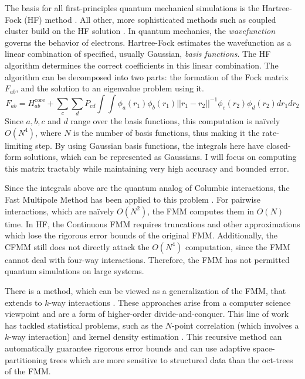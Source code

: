 \documentclass[twoside,leqno, 12pt]{article}
\begin{document}
The basis for all first-principles quantum mechanical simulations is the Hartree-Fock (HF) method \cite{RevModPhys.23.69}.  All other, more sophisticated methods such as coupled cluster build on the HF solution \cite{cc}.  In quantum mechanics, the \emph{wavefunction} governs the behavior of electrons.  Hartree-Fock estimates the wavefunction as a linear combination of specified, usually Gaussian, \emph{basis functions}.  The HF algorithm determines the correct coefficients in this linear combination.  The algorithm can be decomposed into two parts: the formation of the Fock matrix $F_{a b}$, and the solution to an eigenvalue problem using it.  
\begin{displaymath}
F_{a b} = H^{\textrm{core}}_{a b} + \sum_c \sum_d P_{c d} \int \int \phi_a(r_1) \phi_b(r_1) ||r_1 - r_2||^{-1} \phi_c(r_2) \phi_d(r_2) dr_1 dr_2
\end{displaymath}
Since $a, b, c$ and $d$ range over the basis functions, this computation is na\"{i}vely $O(N^4)$, where $N$ is the number of basis functions, thus making it the rate-limiting step.  By using Gaussian basis functions, the integrals here have closed-form solutions, which can be represented as Gaussians.  I will focus on computing this matrix tractably while maintaining very high accuracy and bounded error.


Since the integrals above are the quantum analog of Columbic interactions, the Fast Multipole Method has been applied to this problem \cite{grngard}.  For pairwise interactions, which are na\"{i}vely $O(N^2)$, the FMM computes them in $O(N)$ time.  In HF, the Continuous FMM \cite{white_continuous} requires truncations and other approximations which lose the rigorous error bounds of the original FMM.  Additionally, the CFMM still does not directly attack the $O(N^4)$ computation, since the FMM cannot deal with four-way interactions.  Therefore, the FMM has not permitted quantum simulations on large systems. 


There is a method, which can be viewed as a generalization of the FMM, that extends to $k$-way interactions \cite{gray_nbody, techrep}.  These approaches arise from a computer science viewpoint and are a form of higher-order divide-and-conquer.  This line of work has tackled statistical problems, such as the $N$-point correlation (which involves a $k$-way interaction) \cite{mr:fsta} and kernel density estimation \cite{NIPS2005_570}.  This recursive method can automatically guarantee rigorous error bounds and can use adaptive space-partitioning trees which are more sensitive to structured data than the oct-trees of the FMM.  
\end{document}

